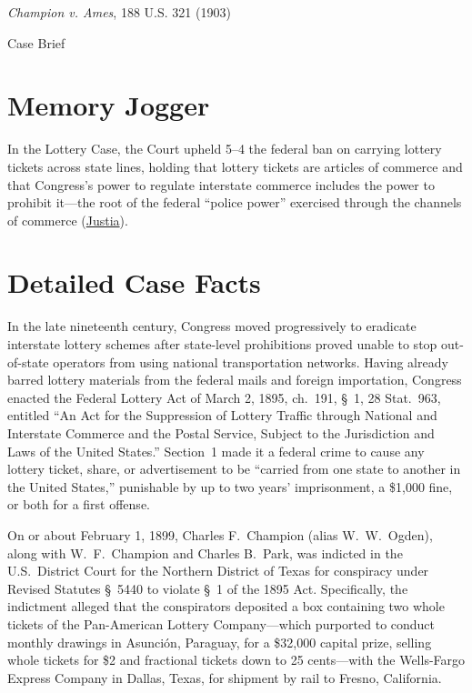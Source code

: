 \documentclass[12pt]{article}
\begin{document}
\begin{center}
{\LARGE \textit{Champion v. Ames}, 188 U.S. 321 (1903)\par}
\vspace{0.8em}
{\large Case Brief\par}
\end{center}
\vspace{1em}

\section{Memory Jogger}
In the Lottery Case, the Court upheld 5--4 the federal ban on carrying lottery tickets across state lines, holding that lottery tickets are articles of commerce and that Congress's power to regulate interstate commerce includes the power to prohibit it---the root of the federal ``police power'' exercised through the channels of commerce (\href{https://supreme.justia.com/cases/federal/us/188/321/}{Justia}).

\section{Detailed Case Facts}
In the late nineteenth century, Congress moved progressively to eradicate interstate lottery schemes after state-level prohibitions proved unable to stop out-of-state operators from using national transportation networks. Having already barred lottery materials from the federal mails and foreign importation, Congress enacted the Federal Lottery Act of March 2, 1895, ch.\ 191, \S~1, 28 Stat.\ 963, entitled ``An Act for the Suppression of Lottery Traffic through National and Interstate Commerce and the Postal Service, Subject to the Jurisdiction and Laws of the United States.'' Section~1 made it a federal crime to cause any lottery ticket, share, or advertisement to be ``carried from one state to another in the United States,'' punishable by up to two years' imprisonment, a \$1,000 fine, or both for a first offense.

On or about February 1, 1899, Charles F.\ Champion (alias W.\ W.\ Ogden), along with W.\ F.\ Champion and Charles B.\ Park, was indicted in the U.S.\ District Court for the Northern District of Texas for conspiracy under Revised Statutes \S~5440 to violate \S~1 of the 1895 Act. Specifically, the indictment alleged that the conspirators deposited a box containing two whole tickets of the Pan-American Lottery Company---which purported to conduct monthly drawings in Asunci\'{o}n, Paraguay, for a \$32,000 capital prize, selling whole tickets for \$2 and fractional tickets down to 25 cents---with the Wells-Fargo Express Company in Dallas, Texas, for shipment by rail to Fresno, California.
\end{document}
